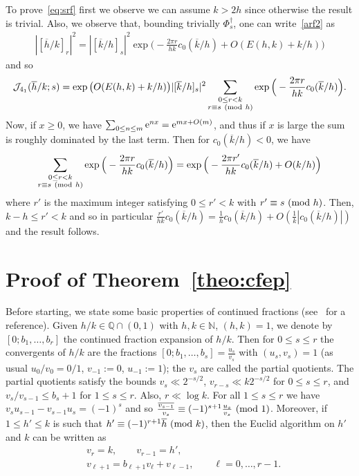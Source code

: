 \documentclass[11pt]{amsart}
\newcommand{\Q}{\mathbb{Q}}
\newcommand{\N}{\mathbb{N}}
\newcommand{\J}{\mathcal{J}}
\renewcommand{\mod}[1]{~\pr{\textnormal{mod}~#1}}
\theoremstyle{definition}
\newcommand{\ssum}[1]{\sum_{\substack{#1}}}
\newcommand{\pr}[1]{\mathchoice{\left( #1\right)}{(#1)}{(#1)}{(#1)}}
\newcommand{\e}[1][]{\ifthenelse{\equal{#1}{}}{{\rm e}}{\operatorname{e}\pr{ #1}}}
\newcommand{\1}{{\mathbf 1}}
\renewcommand{\bar}[1]{\overline{#1}}
\let\originalleft\left
\let\originalright\right
\renewcommand{\left}{\mathopen{}\mathclose\bgroup\originalleft}
\renewcommand{\right}{\aftergroup\egroup\originalright}
\numberwithin{equation}{section}
\begin{document}
To prove~\eqref{eq:srf} first we observe we can assume $k>2h$ since otherwise the result is trivial. Also, we observe that, bounding trivially $\Phi_s^\dagger$, one can write~\eqref{arf2} as 
\begin{align*}
  | [\overline{h}/k]_{r}|^2 = | [\bar k/h]_{s}|^2 \exp\Big(- \frac {2\pi r}{hk}c_0({\overline k}/h)+O(E(h,k)+k/h)\Big)
\end{align*}
and so
\begin{align*}
  \J_{4_1}(\bar h/k; s)= \exp\big(O(E(h,k)+k/h)\big) |[ \bar k/h]_{ s}|^2
  \ssum{0\leq r<k\\ r\equiv s \mod{h}}\exp\Big(- \frac {2\pi r}{hk}c_0({\overline k}/h)\Big).
\end{align*}
Now, if $x\geq0$, we have $\sum_{0\leq n\leq m}\e^{nx}=\e^{mx+O(m)}$, and thus if $x$ is large the sum is roughly dominated by the last term. Then for $c_0({\overline k}/h)<0$, we have 
\begin{align*}
  \ssum{0\leq r<k\\ r\equiv s \mod{h}}\exp\Big(- \frac {2\pi r}{hk}c_0({\overline k}/h)\Big)=\exp\Big(- \frac {2\pi r'}{hk}c_0({\overline k}/h)+O(k/h)\Big)
\end{align*}
where $r'$ is the maximum integer satisfying $0\leq r'< k$ with $r'\equiv s\mod h$. Then, $k-h\leq r'<k$ and so in particular 
$\frac{r'}{hk}c_0({\overline k}/h)=\frac{1}{h}c_0({\overline k}/h)+O(\frac{1}{k}|c_0({\overline k}/h)|)$ and the result follows.

\section{Proof of Theorem~\ref{theo:cfep}}\label{fise}

Before starting, we state some basic properties of continued fractions (see~\cite{Kin} for a reference).  Given $h/k\in\Q\cap(0,1)$ with $h,k\in\N$, $(h,k)=1$, we denote by $[0;b_1,\dots,b_r]$ the continued fraction expansion of $h/k$. Then for $0\leq s\leq r$ the  convergents of $h/k$ are the fractions $[0;b_1,\dots,b_s]=\frac{u_s}{v_s}$ with $(u_s,v_s)=1$ (as usual $u_0/v_0=0/1$, $v_{-1}:=0$, $u_{-1}:=1$); the $v_s$ are called the partial quotients. The partial quotients satisfy the bounds $v_s\ll 2^{-s/2}$, $v_{r-s}\ll  k2^{-s/2}$ 
for $0\leq s\leq r$, and  $v_{s}/v_{s-1}\leq b_{s}+1$ for $1\leq s\leq r$. Also, $r\ll \log k$. For all $1\leq s\leq r$ we have $v_su_{s-1}-v_{s-1}u_s=(-1)^{s}$ and so $\frac{\overline{v_{s-1}}}{v_s}\equiv (-1)^{s+1}\frac{u_s}{v_s}\mod 1$.
Moreover, if $1\leq h'\leq k$ is such that $h'\equiv (-1)^{r+1}\overline h\mod k$, then the Euclid algorithm on $h'$ and $k$ can be written as
\begin{equation}\label{eq:aaa}
  \begin{aligned}
    &v_r=k,\qquad v_{r-1}= h',\\
    &v_{\ell+1}=b_{\ell+1}v_{\ell}+v_{\ell-1},\qquad \ell=0,\dots, r-1.\\
  \end{aligned}
\end{equation}
\end{document}

